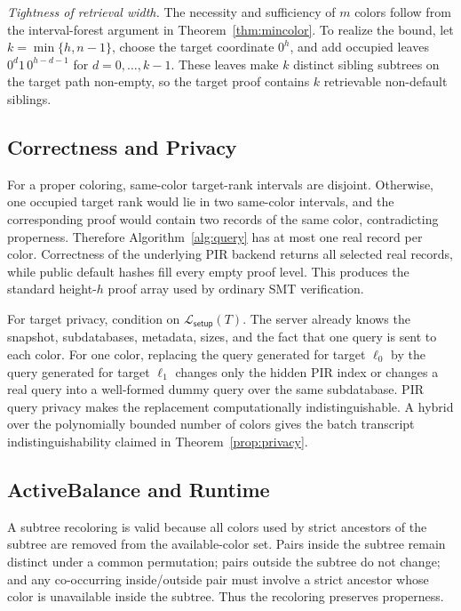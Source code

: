 \emph{Tightness of retrieval width.}
The necessity and sufficiency of \(m\) colors follow from the interval-forest argument in Theorem~\ref{thm:mincolor}. To realize the bound, let \(k=\min\{h,n-1\}\), choose the target coordinate \(0^h\), and add occupied leaves \(0^d1\,0^{h-d-1}\) for \(d=0,\ldots,k-1\). These leaves make \(k\) distinct sibling subtrees on the target path non-empty, so the target proof contains \(k\) retrievable non-default siblings.

\subsection{Correctness and Privacy}

For a proper coloring, same-color target-rank intervals are disjoint. Otherwise, one occupied target rank would lie in two same-color intervals, and the corresponding proof would contain two records of the same color, contradicting properness. Therefore Algorithm~\ref{alg:query} has at most one real record per color. Correctness of the underlying PIR backend returns all selected real records, while public default hashes fill every empty proof level. This produces the standard height-\(h\) proof array used by ordinary SMT verification.

For target privacy, condition on \(\mathcal{L}_{\mathsf{setup}}(T)\). The server already knows the snapshot, subdatabases, metadata, sizes, and the fact that one query is sent to each color. For one color, replacing the query generated for target \(\ell_0\) by the query generated for target \(\ell_1\) changes only the hidden PIR index or changes a real query into a well-formed dummy query over the same subdatabase. PIR query privacy makes the replacement computationally indistinguishable. A hybrid over the polynomially bounded number of colors gives the batch transcript indistinguishability claimed in Theorem~\ref{prop:privacy}.

\subsection{ActiveBalance and Runtime}

A subtree recoloring is valid because all colors used by strict ancestors of the subtree are removed from the available-color set. Pairs inside the subtree remain distinct under a common permutation; pairs outside the subtree do not change; and any co-occurring inside/outside pair must involve a strict ancestor whose color is unavailable inside the subtree. Thus the recoloring preserves properness.

